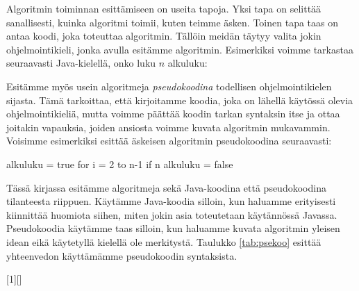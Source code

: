 Algoritmin toiminnan esittämiseen on useita tapoja.
Yksi tapa on selittää sanallisesti, kuinka algoritmi toimii,
kuten teimme äsken.
Toinen tapa taas on antaa koodi, joka toteuttaa algoritmin.
Tällöin meidän täytyy valita jokin ohjelmointikieli,
jonka avulla esitämme algoritmin.
Esimerkiksi voimme tarkastaa seuraavasti Java-kielellä,
onko luku $n$ alkuluku:


Esitämme myös usein algoritmeja \emph{pseudokoodina}
todellisen ohjelmointikielen sijasta.
Tämä tarkoittaa, että kirjoitamme koodia,
joka on lähellä käytössä olevia ohjelmointikieliä, mutta voimme
päättää koodin tarkan syntaksin itse ja ottaa joitakin vapauksia,
joiden ansiosta voimme kuvata algoritmin mukavammin.
Voisimme esimerkiksi esittää äskeisen algoritmin pseudokoodina seuraavasti:

\begin{code}
alkuluku = true
for i = 2 to n-1
    if n%
        alkuluku = false
\end{code}

Tässä kirjassa esitämme algoritmeja sekä Java-koodina että pseudokoodina
tilanteesta riippuen.
Käytämme Java-koodia silloin, kun haluamme erityisesti kiinnittää huomiota siihen,
miten jokin asia toteutetaan käytännössä Javassa.
Pseudokoodia käytämme taas silloin, kun haluamme kuvata algoritmin yleisen
idean eikä käytetyllä kielellä ole merkitystä.
Taulukko \ref{tab:psekoo} esittää yhteenvedon käyttämämme pseudokoodin syntaksista.

[1][]%
{
   \noindent
   \small
   \vspace{0.5\baselineskip}
   \lstset{#1,xleftmargin=0pt}}
{\endminipage}

